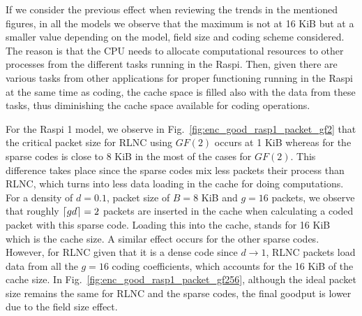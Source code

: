 If we consider the previous effect when reviewing the trends in the
mentioned figures, in all the models we observe that the maximum is not
at 16 KiB but at a smaller value depending on the model, field size
and coding scheme considered. The reason is that the \ac{CPU} needs to
allocate computational resources to other processes from the different tasks
running in the \ac{Raspi}. Then, given there are various
tasks from other applications for proper functioning running in the
\ac{Raspi} at the same time as coding, the cache space is filled also
with the data from these tasks, thus diminishing the cache space available
for coding operations.

For the \ac{Raspi} 1 model, we observe in
Fig.~\ref{fig:enc_good_rasp1_packet_gf2} that the critical
packet size for \ac{RLNC} using $GF(2)$ occurs at 1 KiB whereas for the
sparse codes is close to 8 KiB in the most of the cases for $GF(2)$. This
difference takes place since the sparse codes mix less packets their
process than \ac{RLNC}, which turns into less data loading in the
cache for doing computations. For a density of $d = 0.1$, packet size of
$B = 8$ KiB and $g = 16$ packets, we observe that roughly $\left\lceil gd\right\rceil = 2$
packets are inserted in the cache when calculating a coded packet with this
sparse code. Loading this into the cache, stands for 16 KiB which is the
cache size. A similar effect occurs for the other sparse codes. However, for
\ac{RLNC} given that it is a dense code since $d \to 1$, \ac{RLNC}
packets load data from all the $g = 16$ coding coefficients, which accounts
for the 16 KiB of the cache size. In
Fig.~\ref{fig:enc_good_rasp1_packet_gf256}, although the ideal packet
size remains the same for \ac{RLNC} and the sparse codes, the final goodput
is lower due to the field size effect.
%
